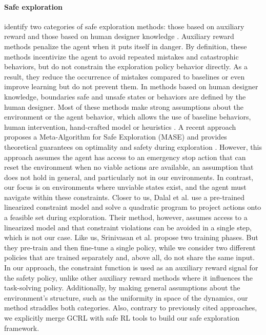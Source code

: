 \paragraph{\textbf{Safe exploration}}
\citeauthor{exploration_survey} identify two categories of safe exploration methods: those based on
auxiliary reward and those based on human designer knowledge \cite{exploration_survey}. 
Auxiliary reward methods penalize the agent when it puts itself in danger. 
By definition, these methods incentivize the agent to avoid repeated mistakes and catastrophic behaviors, 
but do not constrain the exploration policy behavior directly. As a result, they reduce the occurrence of 
mistakes compared to baselines \cite{karimpanal2020learning} or even improve learning 
\cite{lipton2018sisyphean, fatemiDeadEnds} but do not prevent them.
In methods based on human designer knowledge, boundaries safe and unsafe states or behaviors 
are defined by the human designer. Most of these methods make strong assumptions about the environment
or the agent behavior, which allows the use of baseline behaviors, 
human intervention, hand-crafted model or heuristics
\cite{GarciaSafeExp2012,VerifSafeExp,TrialWithoutErrorSafeExp,SafeExpGPMDP}. 
A recent approach proposes a Meta-Algorithm for Safe Exploration (MASE) and provides theoretical guarantees on 
optimality and safety during exploration \cite{MASESafeExp}. However, this approach assumes the agent has access to an emergency stop action that can reset the environment when no viable actions are available, an assumption that does not hold in general, and particularly not in our environments. In contrast, our focus is on environments where unviable states exist, and the agent must navigate within these constraints.
Closer to us, Dalal et al. \cite{dalal2018safetyLayer} use a pre-trained linearized constraint model and solve a quadratic program to project actions onto a feasible set during exploration. Their method, however, assumes access to a linearized model and that constraint violations can be avoided in a single step, which is not our case.
Like us, Srinivasan et al. \cite{2020safetyCritic} propose two training phases. But they pre-train and then fine-tune a single policy, while we consider two different policies that are trained separately and, above all, do not share the same input. 
In our approach, the constraint function is used as an auxiliary reward signal for the safety policy, unlike other auxiliary reward methods where it influences the task-solving policy. Additionally, by making general assumptions about the environment's structure, such as the uniformity in space of the dynamics, our method straddles both categories.
Also, contrary to previously cited approaches, we explicitly merge GCRL with safe RL tools to build our safe exploration framework.


